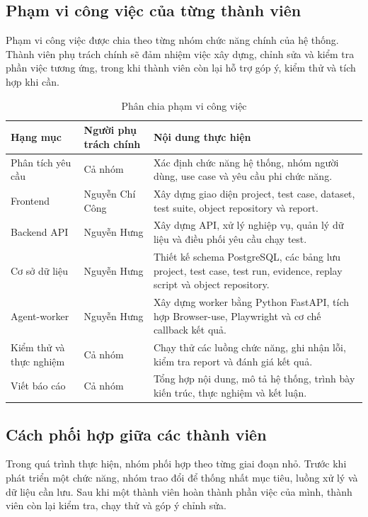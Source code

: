 \subsection{Phạm vi công việc của từng thành viên}

Phạm vi công việc được chia theo từng nhóm chức năng chính của hệ thống. Thành viên phụ trách chính sẽ đảm nhiệm việc xây dựng, chỉnh sửa và kiểm tra phần việc tương ứng, trong khi thành viên còn lại hỗ trợ góp ý, kiểm thử và tích hợp khi cần.

\begin{table}[H]
\centering
\caption{Phân chia phạm vi công việc}
\label{tab:chapter7_work_scope}
\renewcommand{\arraystretch}{1.2}
\begin{tabular}{|p{4.2cm}|p{5.0cm}|p{5.0cm}|}
\hline
\textbf{Hạng mục} & \textbf{Người phụ trách chính} & \textbf{Nội dung thực hiện} \\
\hline
Phân tích yêu cầu & Cả nhóm & Xác định chức năng hệ thống, nhóm người dùng, use case và yêu cầu phi chức năng. \\
\hline
Frontend & Nguyễn Chí Công & Xây dựng giao diện project, test case, dataset, test suite, object repository và report. \\
\hline
Backend API & Nguyễn Hưng & Xây dựng API, xử lý nghiệp vụ, quản lý dữ liệu và điều phối yêu cầu chạy test. \\
\hline
Cơ sở dữ liệu & Nguyễn Hưng & Thiết kế schema PostgreSQL, các bảng lưu project, test case, test run, evidence, replay script và object repository. \\
\hline
Agent-worker & Nguyễn Hưng & Xây dựng worker bằng Python FastAPI, tích hợp Browser-use, Playwright và cơ chế callback kết quả. \\
\hline
Kiểm thử và thực nghiệm & Cả nhóm & Chạy thử các luồng chức năng, ghi nhận lỗi, kiểm tra report và đánh giá kết quả. \\
\hline
Viết báo cáo & Cả nhóm & Tổng hợp nội dung, mô tả hệ thống, trình bày kiến trúc, thực nghiệm và kết luận. \\
\hline
\end{tabular}
\end{table}

\subsection{Cách phối hợp giữa các thành viên}

Trong quá trình thực hiện, nhóm phối hợp theo từng giai đoạn nhỏ. Trước khi phát triển một chức năng, nhóm trao đổi để thống nhất mục tiêu, luồng xử lý và dữ liệu cần lưu. Sau khi một thành viên hoàn thành phần việc của mình, thành viên còn lại kiểm tra, chạy thử và góp ý chỉnh sửa.

